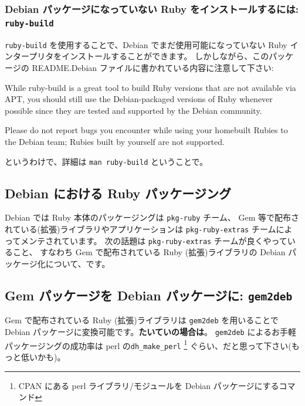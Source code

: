 \documentclass[mingoth,a4paper]{jsarticle}
\begin{document}
\subsubsection{Debian パッケージになっていない Ruby をインストールするには: \texttt{ruby-build}}

\texttt{ruby-build} を使用することで、Debian でまだ使用可能になっていない Ruby インタープリタをインストールすることができます。
しかしながら、このパッケージの README.Debian ファイルに書かれている内容に注意して下さい:
\begin{commandline}
  While ruby-build is a great tool to build Ruby versions that are not
  available via APT, you should still use the Debian-packaged versions
  of Ruby whenever possible since they are tested and supported by the
  Debian community.

  Please do not report bugs you encounter while using your homebuilt
  Rubies to the Debian team; Rubies built by yourself are not supported.
\end{commandline}
というわけで、詳細は \texttt{man ruby-build} ということで。

\subsection{Debian における Ruby パッケージング}

Debian では Ruby 本体のパッケージングは \texttt{pkg-ruby} チーム、
Gem 等で配布されている(拡張)ライブラリやアプリケーションは
\texttt{pkg-ruby-extras} チームによってメンテされています。
次の話題は
\texttt{pkg-ruby-extras} チームが良くやっていること、
すなわち Gem で配布されている Ruby (拡張)ライブラリの Debian パッケージ化について、です。

\subsection{Gem パッケージを Debian パッケージに: \texttt{gem2deb}}

Gem で配布されている Ruby (拡張)ライブラリは
\texttt{gem2deb} を用いることで Debian パッケージに変換可能です。\textbf{たいていの場合は}。
\texttt{gem2deb} によるお手軽パッケージングの成功率は perl の\texttt{dh\_make\_perl}
\footnote{%
  CPAN にある perl ライブラリ/モジュールを Debian パッケージにするコマンド
}
ぐらい、だと思って下さい(もっと低いかも)。
\end{document}
